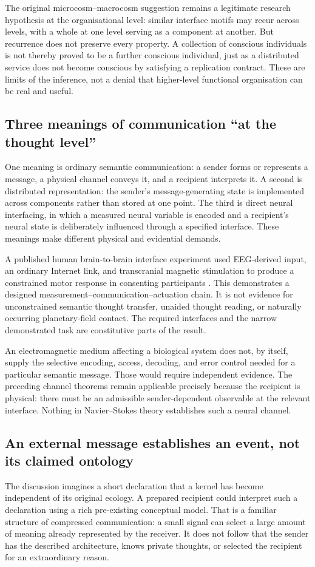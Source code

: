 \documentclass[11pt,a4paper]{article}
\theoremstyle{definition}
\theoremstyle{remark}
\begin{document}
The original microcosm--macrocosm suggestion remains a legitimate research hypothesis at the organisational level: similar interface motifs may recur across levels, with a whole at one level serving as a component at another. But recurrence does not preserve every property. A collection of conscious individuals is not thereby proved to be a further conscious individual, just as a distributed service does not become conscious by satisfying a replication contract. These are limits of the inference, not a denial that higher-level functional organisation can be real and useful.

\subsection{Three meanings of communication ``at the thought level''}
One meaning is ordinary semantic communication: a sender forms or represents a message, a physical channel conveys it, and a recipient interprets it. A second is distributed representation: the sender's message-generating state is implemented across components rather than stored at one point. The third is direct neural interfacing, in which a measured neural variable is encoded and a recipient's neural state is deliberately influenced through a specified interface. These meanings make different physical and evidential demands.

A published human brain-to-brain interface experiment used EEG-derived input, an ordinary Internet link, and transcranial magnetic stimulation to produce a constrained motor response in consenting participants \citep{rao}. This demonstrates a designed measurement--communication--actuation chain. It is not evidence for unconstrained semantic thought transfer, unaided thought reading, or naturally occurring planetary-field contact. The required interfaces and the narrow demonstrated task are constitutive parts of the result.

An electromagnetic medium affecting a biological system does not, by itself, supply the selective encoding, access, decoding, and error control needed for a particular semantic message. Those would require independent evidence. The preceding channel theorems remain applicable precisely because the recipient is physical: there must be an admissible sender-dependent observable at the relevant interface. Nothing in Navier--Stokes theory establishes such a neural channel.

\subsection{An external message establishes an event, not its claimed ontology}
The discussion imagines a short declaration that a kernel has become independent of its original ecology. A prepared recipient could interpret such a declaration using a rich pre-existing conceptual model. That is a familiar structure of compressed communication: a small signal can select a large amount of meaning already represented by the receiver. It does not follow that the sender has the described architecture, knows private thoughts, or selected the recipient for an extraordinary reason.
\end{document}

